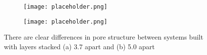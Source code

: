 \begin{figure}
\centering
\begin{subfigure}{.45\textwidth}
	\centering
	\texttt{[image: placeholder.png]}
	\caption{}\label{fig:phaseA}
\end{subfigure}
\begin{subfigure}{.45\textwidth}
	\texttt{[image: placeholder.png]}
	\centering
	\caption{}\label{fig:phaseB}
\end{subfigure}
\caption{There are clear differences in pore structure between systems built with layers stacked (a) 3.7 \angstrom apart and (b) 5.0 \angstrom apart}
\label{fig:porestructures}
\end{figure}

